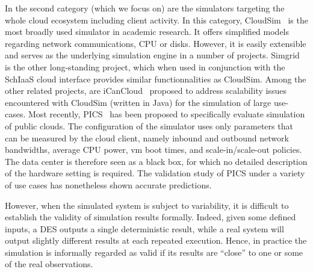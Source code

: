 \documentclass[]{llncs}
\begin{document}
In the  second category  (which we  focus on) are  the simulators  targeting the
whole   cloud  ecosystem   including  client   activity.   In   this  category,
CloudSim~\cite{cloudsim}  is  the  most   broadly  used  simulator  in  academic
research.  It offers simplified models  regarding network communications, CPU or
disks. However, it is easily extensible  and serves as the underlying simulation
engine in a number of projects. Simgrid~\cite{simgrid} is the other long-standing
project,  which  when used  in  conjunction  with  the SchIaaS  cloud  interface
provides  similar  functionnalities  as   CloudSim.   Among  the  other  related
projects, are iCanCloud~\cite{iCanCloud} proposed  to address scalability issues
encountered  with  CloudSim  (written  in  Java) for  the  simulation  of  large
use-cases.  Most recently,  PICS~\cite{pics} has  been proposed  to specifically
evaluate simulation of  public clouds.  The configuration of  the simulator uses
only parameters  that can be  measured by the  cloud client, namely  inbound and
outbound  network  bandwidths,  average  CPU  power,  \ac{vm}  boot  times,  and
scale-in/scale-out policies. The  data center is therefore seen as  a black box,
for which  no detailed  description of  the hardware  setting is  required.  The
validation study  of PICS  under a  variety of use  cases has  nonetheless shown
accurate predictions.


However, when the simulated system is subject to variability, it is difficult to
establish  the  validity of  simulation  results  formally. Indeed,  given  some
defined inputs, a DES outputs a single deterministic result, while a real system
will output  slightly different results  at each repeated execution.   Hence, in
practice  the simulation  is informally  regarded as  valid if  its results  are
``close'' to one or  some of the real observations. 
\end{document}
